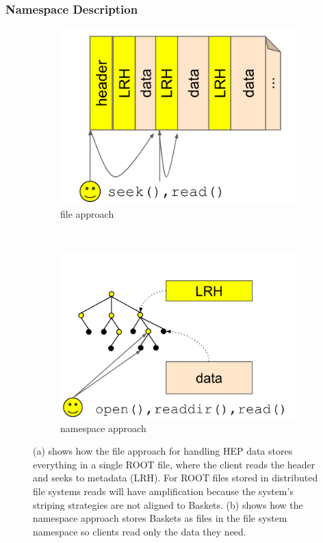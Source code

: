 \subsubsection{Namespace Description}

\begin{figure}[t!]
    \centering
    \begin{subfigure}[b]{.5\linewidth}
      \centering
      \includegraphics[width=1.0\linewidth]{figures/tree_hep_a.png} 
      \caption{file approach}
      \label{fig:tree_hep_a}
    \end{subfigure}
    ~ 
    \begin{subfigure}[b]{.5\linewidth}
      \centering
      \includegraphics[width=1.0\linewidth]{figures/tree_hep_b.png} 
      \caption{namespace approach}
      \label{fig:tree_hep_b}
    \end{subfigure}
    \caption{(a) shows how the file approach for handling HEP data stores
everything in a single ROOT file, where the client reads the header and seeks
to metadata (LRH). For ROOT files stored in distributed file systems reads will
have amplification because the system's striping strategies are not aligned to
Baskets. (b) shows how the namespace approach stores Baskets as files in the
file system namespace so clients read only the data they need.}
\end{figure}

